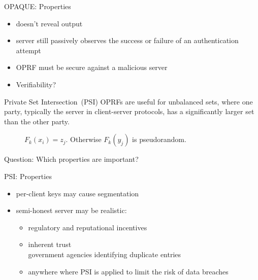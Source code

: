 \documentclass[aspectratio=169, 12pt,handout]{beamer}
\begin{document}
\begin{frame}{OPAQUE: Properties}
  \begin{itemize}
    \item doesn't reveal output\pause
    \item server still passively observes the success or failure of an authentication
      attempt\pause
    \item OPRF must be secure against a malicious server\pause
    \item Verifiability? 
  \end{itemize}
\end{frame}


\begin{frame}{Private Set Intersection~(PSI)}
  OPRFs are useful for \alert{unbalanced} sets, where one party, typically the
  server in client-server protocols, has a significantly larger set than the other party. 
  \begin{figure}
    \centering
    \(F_{k}(x_i) = z_{j}\).
    Otherwise \(F_{k}(y_j)\) is pseudorandom.
  \end{figure}\pause
  \hspace*{\fill} \alert{Question: Which properties are important?}
\end{frame}

\begin{frame}{PSI: Properties}
  \begin{itemize}
    \item per-client keys may cause segmentation \pause
    \item semi-honest server may be realistic: \pause
      \begin{itemize}
        \item regulatory and reputational incentives~\cite{USENIX:KRSSW19}\pause
        \item inherent trust\\ government agencies identifying duplicate entries\pause
        \item anywhere where PSI is applied to limit the risk of data breaches
      \end{itemize}
  \end{itemize}
\end{frame}
\end{document}
